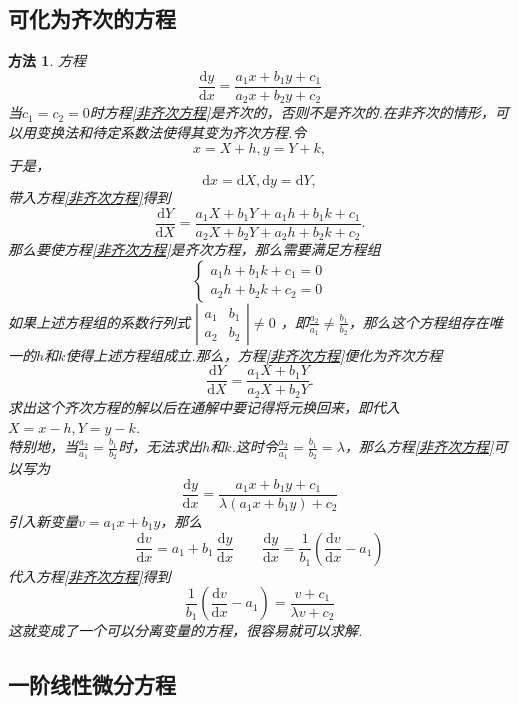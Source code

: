 \documentclass[12pt,a4paper]{book}
\numberwithin{equation}{section}
\newtheorem{method}{\hspace*{0.3cm}\color{ff}\textleaf 方法}[section]
\begin{document}
\subsection{可化为齐次的方程}
\begin{method}
    \hspace{0.3cm}方程
    \begin{equation}
        \frac{\mathrm{d}y}{\mathrm{d}x}=\frac{a_1x+b_1y+c_1}{a_2x+b_2y+c_2}
        \label{非齐次方程}
    \end{equation}
    当$c_1=c_2=0$时方程\eqref{非齐次方程}是齐次的，否则不是齐次的.在非齐次的情形，可以用变换法和待定系数法使得其变为齐次方程.令
    $$x=X+h,y=Y+k,$$
    于是，
    $$\mathrm{d}x=\mathrm{d}X,\mathrm{d}y=\mathrm{d}Y,$$
    带入方程\eqref{非齐次方程}得到
    $$\frac{\mathrm{d}Y}{\mathrm{d}X}=\frac{a_1X+b_1Y+a_1h+b_1k+c_1}{a_2X+b_2Y+a_2h+b_2k+c_2}.$$
    那么要使方程\eqref{非齐次方程}是齐次方程，那么需要满足方程组
    $$\left\lbrace
        \begin{array}{l}
            a_1h+b_1k+c_1=0 \\
            a_2h+b_2k+c_2=0
        \end{array}
        \right.$$
    如果上述方程组的系数行列式
    $\left| \begin{array}{cc}
            a_1 & b_1 \\
            a_2 & b_2
        \end{array}  \right| \ne 0$
    ，即$\displaystyle\frac{a_2}{a_1}\ne \frac{b_1}{b_2} $，那么这个方程组存在唯一的$h$和$k$使得上述方程组成立.那么，方程\eqref{非齐次方程}便化为齐次方程
    $$\frac{\mathrm{d}Y}{\mathrm{d}X}=\frac{a_1X+b_1Y}{a_2X+b_2Y}.$$
    求出这个齐次方程的解以后在通解中要记得将元换回来，即代入$X=x-h,Y=y-k$.\vspace*{0.2cm}\\

    \hspace*{0.5cm}特别地，当$\displaystyle\frac{a_2}{a_1}= \frac{b_1}{b_2}$时，无法求出$h$和$k$.这时令$\displaystyle\frac{a_2}{a_1}= \frac{b_1}{b_2}=\lambda $，那么方程\eqref{非齐次方程}可以写为
    $$\frac{\mathrm{d}y}{\mathrm{d}x}=\frac{a_1x+b_1y+c_1}{\lambda (a_1x+b_1y)+c_2}$$
    引入新变量$v=a_1x+b_1y$，那么
    $$\frac{\mathrm{d}v}{\mathrm{d}x}=a_1+b_1 \, \frac{\mathrm{d}y}{\mathrm{d}x} \qquad \frac{\mathrm{d}y}{\mathrm{d}x}=\frac{1}{b_1}\left(\frac{\mathrm{d}v}{\mathrm{d}x}-a_1 \right) $$
    代入方程\eqref{非齐次方程}得到
    $$\frac{1}{b_1}\left(\frac{\mathrm{d}v}{\mathrm{d}x}-a_1 \right)=\frac{v+c_1}{\lambda v+c_2}$$
    这就变成了一个可以分离变量的方程，很容易就可以求解.
\end{method}

\subsection{一阶线性微分方程}




\newpage
{}
\appendix
\kaishu
\printindex
\end{document}
